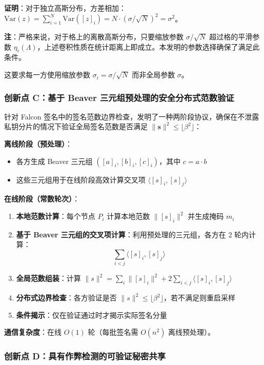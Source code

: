 \documentclass[12pt,a4paper]{article}
\begin{document}
\textbf{证明}：对于独立高斯分布，方差相加：$\text{Var}(z) = \sum_{i=1}^{N} \text{Var}([z]_i) = N \cdot (\sigma/\sqrt{N})^2 = \sigma^2$。

\textbf{注}：严格来说，对于格上的离散高斯分布，只要缩放参数 $\sigma/\sqrt{N}$ 超过格的平滑参数 $\eta_\epsilon(\Lambda)$，上述卷积性质在统计距离上即成立。本发明的参数选择确保了满足此条件。

这要求每一方使用缩放参数 $\sigma_i = \sigma/\sqrt{N}$ 而非全局参数 $\sigma$。

\subsubsection{创新点 C：基于 Beaver 三元组预处理的安全分布式范数验证}

针对 Falcon 签名中的签名范数边界检查，发明了一种两阶段协议，确保在不泄露私钥分片的情况下验证全局签名范数是否满足 $\|\mathbf{s}\|^2 \le \lfloor \beta^2 \rfloor$：

\textbf{离线阶段（预处理）}：
\begin{itemize}
    \item 各方生成 Beaver 三元组 $([a]_i, [b]_i, [c]_i)$，其中 $c = a \cdot b$
    \item 这些三元组用于在线阶段高效计算交叉项 $\langle [s]_i, [s]_j \rangle$
\end{itemize}

\textbf{在线阶段（常数轮次）}：
\begin{enumerate}
    \item \textbf{本地范数计算}：每个节点 $P_i$ 计算本地范数 $\|[s]_i\|^2$ 并生成掩码 $m_i$
    \item \textbf{基于 Beaver 三元组的交叉项计算}：利用预处理的三元组，各方在 2 轮内计算：
    $$\sum_{i<j} \langle [s]_i, [s]_j \rangle$$
    \item \textbf{全局范数组装}：计算 $\|s\|^2 = \sum_i \|[s]_i\|^2 + 2\sum_{i<j} \langle [s]_i, [s]_j \rangle$
    \item \textbf{分布式边界检查}：各方验证是否 $\|s\|^2 \le \lfloor \beta^2 \rfloor$，若不满足则重启采样
    \item \textbf{条件揭示}：仅在验证通过时才揭示实际签名分量
\end{enumerate}

\textbf{通信复杂度}：在线 $O(1)$ 轮（每批签名需 $O(n^2)$ 离线预处理）。

\subsubsection{创新点 D：具有作弊检测的可验证秘密共享}
\end{document}
